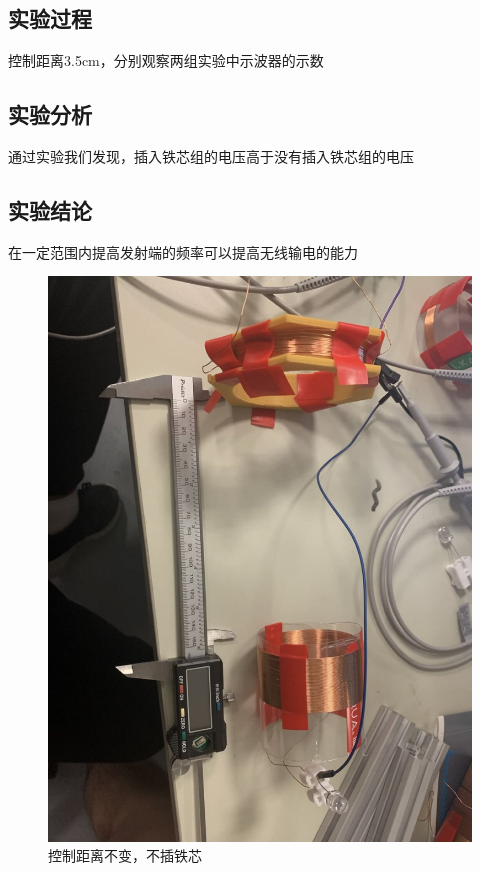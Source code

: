 \documentclass[conference]{IEEEtran}
\theoremstyle{break}
\begin{document}
\subsection{实验过程}
控制距离3.5cm，分别观察两组实验中示波器的示数
\subsection{实验分析}
通过实验我们发现，插入铁芯组的电压高于没有插入铁芯组的电压
\subsection{实验结论}
在一定范围内提高发射端的频率可以提高无线输电的能力
\begin{figure}[htbp]
        \centerline{\includegraphics[scale=0.1]{频率1.png}}
        \caption{控制距离不变，不插铁芯}
        \label{fig}
        \end{figure}
\end{document}
